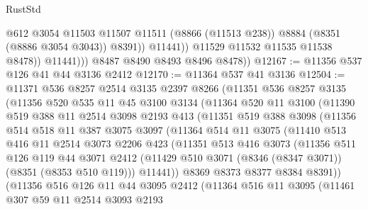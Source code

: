\begin{lexlean}{RustStd}
\begin{coremodule}
                          @612
                          @3054
                          @11503
                          @11507
                          @11511
                          (@8866 (@11513 @238))
                          @8884
                          (@8351 (@8886 @3054 @3043))
                          @8391))
                      @11441))
                  @11529
                  @11532
                  @11535
                  @11538
                  @8478))
              @11441)))
        @8487
        @8490
        @8493
        @8496
        @8478))
@12167 := @11356 @537 @126 @41 @44 @3136 @2412
@12170 := @11364 @537 @41 @3136
@12504 := @11371
    @536
    @8257
    @2514
    @3135
    @2397
    @8266
    (@11351
      @536
      @8257
      @3135
      (@11356
        @520
        @535
        @11
        @45
        @3100
        @3134
        (@11364
          @520
          @11
          @3100
          (@11390
            @519
            @388
            @11
            @2514
            @3098
            @2193
            @413
            (@11351
              @519
              @388
              @3098
              (@11356
                @514
                @518
                @11
                @387
                @3075
                @3097
                (@11364
                  @514
                  @11
                  @3075
                  (@11410
                    @513
                    @416
                    @11
                    @2514
                    @3073
                    @2206
                    @423
                    (@11351
                      @513
                      @416
                      @3073
                      (@11356
                        @511
                        @126
                        @119
                        @44
                        @3071
                        @2412
                        (@11429 @510 @3071 (@8346 (@8347 @3071)) (@8351 (@8353 @510 @119)))
                        @11441))
                    @8369
                    @8373
                    @8377
                    @8384
                    @8391))
                (@11356
                  @516
                  @126
                  @11
                  @44
                  @3095
                  @2412
                  (@11364
                    @516
                    @11
                    @3095
                    (@11461
                      @307
                      @59
                      @11
                      @2514
                      @3093
                      @2193

\end{coremodule}
\end{lexlean}
